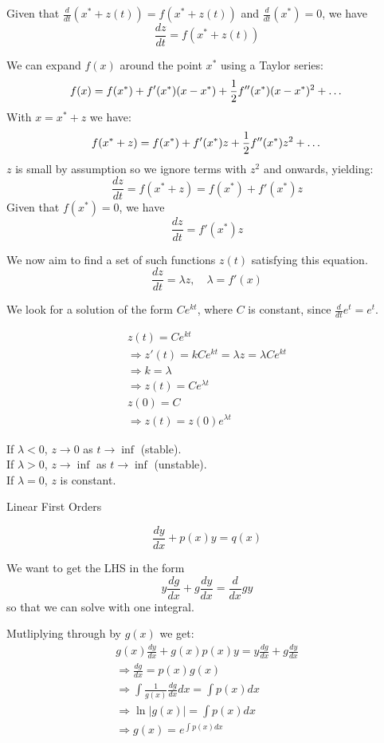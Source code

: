 \documentclass[a4paper,10pt]{article}
\begin{document}
Given that $\frac{d}{dt}(x^* + z(t)) = f(x^* + z(t))$ and
$\frac{d}{dt}(x^*) = 0$, we have
\[
	\frac{dz}{dt} = f(x^* + z(t))
\]

We can expand $f(x)$ around the point $x^*$ using a Taylor series:
\[
	f(x) = f(x^*) + f'(x^*)(x - x^*) + \frac{1}{2}f''(x^*)(x - x^*)^2 + \dots \\
\]
With $x = x^* + z$ we have:
\[
	f(x^* + z) = f(x^*) + f'(x^*)z + \frac{1}{2}f''(x^*)z^2 + \dots \\
\]
$z$ is small by assumption so we ignore terms with $z^2$ and onwards, yielding:
\[
	\frac{dz}{dt} = f(x^* + z) = f(x^*) + f'(x^*)z
\]
Given that $f(x^*) = 0$, we have
\[
	\frac{dz}{dt} = f'(x^*)z
\]

We now aim to find a set of such functions $z(t)$ satisfying this equation.
\[
	\frac{dz}{dt} = \lambda z, \quad \lambda = f'(x)
\]

We look for a solution of the form $Ce^{kt}$, where $C$ is constant,
since $\frac{d}{dt} e^t = e^t$.

\begin{gather*}
	z(t) = Ce^{kt} \\
	\Rightarrow z'(t) = kCe^{kt} = \lambda z = \lambda Ce^{kt} \\
	\Rightarrow k = \lambda \\
	\Rightarrow z(t) = Ce^{\lambda t} \\
	z(0) = C \\
	\Rightarrow z(t) = z(0)e^{\lambda t}
\end{gather*}

If $\lambda < 0$, $z \to 0$ as $t \to \inf$ (stable). \\
If $\lambda > 0$, $z \to \inf$ as $t \to \inf$ (unstable). \\
If $\lambda = 0$, $z$ is constant.

Linear First Orders

\[
	\frac{dy}{dx} + p(x)y = q(x)
\]

We want to get the LHS in the form
\[
	y\frac{dg}{dx} + g\frac{dy}{dx} = \frac{d}{dx} gy
\]
so that we can solve with one integral.

Mutliplying through by $g(x)$ we get:
\begin{gather*}
	g(x)\frac{dy}{dx} + g(x)p(x)y = y\frac{dg}{dx} + g\frac{dy}{dx} \\
	\Rightarrow \frac{dg}{dx} = p(x)g(x) \\
	\Rightarrow \int \frac{1}{g(x)} \frac{dg}{dx} dx = \int p(x) dx \\
	\Rightarrow \ln |g(x)| = \int p(x) dx \\
	\Rightarrow g(x) = e^{\int p(x) dx}
\end{gather*}
\end{document}
